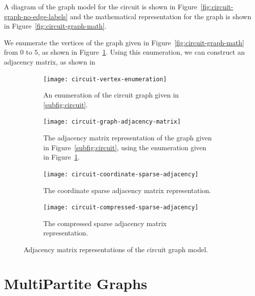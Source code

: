 A diagram of the graph model for the circuit is shown in Figure~\ref{fig:circuit-graph-no-edge-labels} and the mathematical representation for the graph is shown
  in Figure~\ref{fig:circuit-graph-math}.
  \item We enumerate the vertices of the graph given in Figure~\ref{fig:circuit-graph-math} from $0$ to $5$, as
  shown in Figure~\ref{fig:circuit-vertex-enumeration}.  Using this enumeration, we can construct an adjacency matrix,
  as shown in

\begin{figure}[bh]
  \begin{subfigure}[t]{0.175\textwidth}
    \centering
    \texttt{[image: circuit-vertex-enumeration]}
    \caption{\label{fig:circuit-vertex-enumeration}
    An enumeration of the circuit graph given in \protect\ref{subfig:circuit}.}
  \end{subfigure}
  \hspace{1em}
  \begin{subfigure}[t]{0.25\textwidth}
    \centering
    \texttt{[image: circuit-graph-adjacency-matrix]}
    \caption{\label{fig:circuit-graph-adjacency-matrix}
    The adjacency matrix representation of the graph given in Figure~\protect\ref{subfig:circuit},
    using the enumeration given in Figure~\protect\ref{fig:circuit-vertex-enumeration}.}
  \end{subfigure}
  \hspace{1em}
  \begin{subfigure}[t]{0.175\textwidth}
    \small
    \centering
    \texttt{[image: circuit-coordinate-sparse-adjacency]}
    \caption{\label{fig:circuit-coordinate-sparse-adjacency}
    The coordinate sparse adjacency matrix representation.}
  \end{subfigure}
  \hspace{1em}
  \begin{subfigure}[t]{0.3\textwidth}
    \small
    \centering
    \texttt{[image: circuit-compressed-sparse-adjacency]}
    \caption{\label{fig:circuit-compressed-sparse-adjacency}
    The compressed sparse adjacency matrix representation.}
  \end{subfigure}
  \caption{Adjacency matrix representations of the circuit graph model.}
\end{figure}





\section{MultiPartite Graphs}
\label{sec:multipartite}

